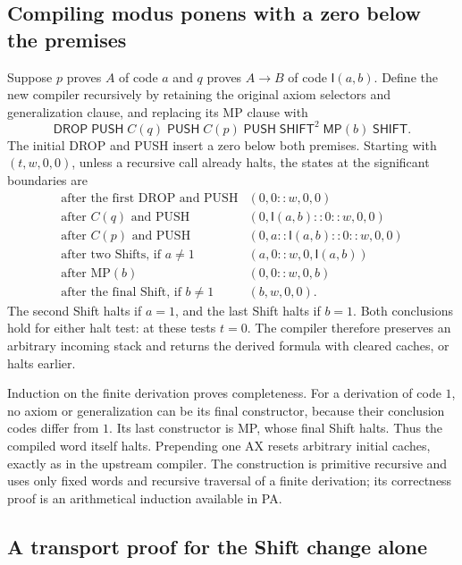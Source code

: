 \subsection{Compiling modus ponens with a zero below the premises}

Suppose $p$ proves $A$ of code $a$ and $q$ proves $A\to B$ of code
$\mathsf I(a,b)$. Define the new compiler recursively by retaining
the original axiom selectors and generalization clause, and replacing
its MP clause with
\begin{equation}\label{eq:new-mp-word-audit}
 \mathsf{DROP}\;\mathsf{PUSH}\;C(q)\;\mathsf{PUSH}\;
 C(p)\;\mathsf{PUSH}\;\mathsf{SHIFT}^{2}\;
 \mathsf{MP}(b)\;\mathsf{SHIFT}.
\end{equation}
The initial DROP and PUSH insert a zero below both premises. Starting
with $(t,w,0,0)$, unless a recursive call already halts, the states at
the significant boundaries are
\[
\begin{array}{c|c}
 \text{after the first DROP and PUSH}&(0,0::w,0,0)\\
 \text{after }C(q)\text{ and PUSH}&(0,\mathsf I(a,b)::0::w,0,0)\\
 \text{after }C(p)\text{ and PUSH}&(0,a::\mathsf I(a,b)::0::w,0,0)\\
 \text{after two Shifts, if }a\ne1&(a,0::w,0,\mathsf I(a,b))\\
 \text{after MP}(b)&(0,0::w,0,b)\\
 \text{after the final Shift, if }b\ne1&(b,w,0,0).
\end{array}
\]
The second Shift halts if $a=1$, and the last Shift halts if $b=1$.
Both conclusions hold for either halt test: at these tests $t=0$.
The compiler therefore preserves an arbitrary incoming stack and returns
the derived formula with cleared caches, or halts earlier.

Induction on the finite derivation proves completeness. For a derivation
of code $1$, no axiom or generalization can be its final constructor,
because their conclusion codes differ from $1$. Its last constructor
is MP, whose final Shift halts. Thus the compiled word itself halts.
Prepending one AX resets arbitrary initial caches, exactly as in the
upstream compiler. The construction is primitive recursive and uses
only fixed words and recursive traversal of a finite derivation; its
correctness proof is an arithmetical induction available in PA.

\subsection{A transport proof for the Shift change alone}

